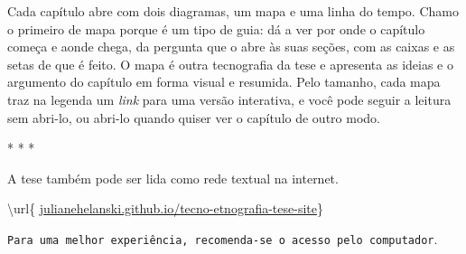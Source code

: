 Cada capítulo abre com dois diagramas, um mapa e uma linha do tempo. Chamo o primeiro de mapa porque é um tipo de guia: dá a ver por onde o capítulo começa e aonde chega, da pergunta que o abre às suas seções, com as caixas e as setas de que é feito. O mapa é outra tecnografia da tese e apresenta as ideias e o argumento do capítulo em forma visual e resumida. Pelo tamanho, cada mapa traz na legenda um \emph{link} para uma versão interativa, e você pode seguir a leitura sem abri-lo, ou abri-lo quando quiser ver o capítulo de outro modo.

\begin{center}
  * * *
\end{center}
A tese também pode ser lida como rede textual na internet.\begin{center}
  {\ttfamily\small\color{latexneon}\textbackslash url\{%
   \color{black}\href{https://julianehelanski.github.io/tecno-etnografia-tese-site/}%
   {julianehelanski.github.io/tecno-etnografia-tese-site}\color{latexneon}\}}\par
  \vspace{4pt}
  {\small\texttt{Para uma melhor experiência, recomenda-se o acesso pelo computador}.}
\end{center}

